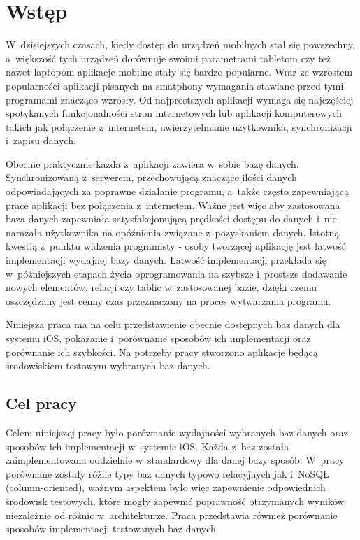 \section{Wstęp}

 W~dzisiejszych czasach, kiedy dostęp do urządzeń mobilnych stał się powszechny, a~większość tych urządzeń dorównuje swoimi parametrami tabletom czy też nawet laptopom aplikacje mobilne stały się bardzo popularne. Wraz ze wzrostem popularności aplikacji pisanych na smatphony wymagania stawiane przed tymi programami znacząco wzrosły. Od najprostszych aplikacji wymaga się najczęściej spotykanych funkcjonalności stron internetowych lub aplikacji komputerowych takich jak połączenie z~internetem, uwierzytelnianie użytkownika, synchronizacji i~zapisu danych. \nocite{Swift-doc} \nocite{Realm-doc} \nocite{FMDB-doc} \nocite{CoreData-doc} \nocite{PorownanieRealm} \nocite{Mockaroo} \nocite{PorownanieDrDobbs} \nocite{SQLite-book} \nocite{CoreDataBook} \nocite{Art2Key} \nocite{Art3Key} \nocite{Art4Key}
\par
Obecnie praktycznie każda z~aplikacji zawiera w~sobie bazę danych. Synchronizowaną z~serwerem, przechowującą znaczące ilości danych odpowiadających za poprawne działanie programu, a~także często zapewniającą prace aplikacji bez połączenia z~internetem. Ważne jest więc aby zastosowana baza danych zapewniała satysfakcjonującą prędkości dostępu do danych i~nie narażała użytkownika na opóźnienia związane z~pozyskaniem danych. Istotną kwestią z~punktu widzenia programisty - osoby tworzącej aplikację jest łatwość implementacji wydajnej bazy danych. Łatwość implementacji przekłada się w~późniejszych etapach życia oprogramowania na szybsze i~prostsze dodawanie nowych elementów, relacji czy tablic w~zastosowanej bazie, dzięki czemu oszczędzany jest cenny czas przeznaczony na proces wytwarzania programu. \par

Niniejsza praca ma na celu przedstawienie obecnie dostępnych baz danych dla systemu iOS, pokazanie i~porównanie  sposobów ich implementacji oraz porównanie ich szybkości. Na potrzeby pracy stworzono aplikacje będącą środowiskiem testowym wybranych baz danych. 
	
\subsection{Cel pracy}

Celem niniejszej pracy było porównanie wydajności wybranych baz danych oraz sposobów ich implementacji w~systemie iOS. Każda z~baz została zaimplementowana oddzielnie w~standardowy dla danej bazy sposób. W~pracy porównane zostały różne typy baz danych typowo relacyjnych jak i~NoSQL (column-oriented), ważnym aspektem było więc zapewnienie odpowiednich środowisk testowych, które mogły zapewnić poprawność otrzymanych wyników niezależnie od różnic w~architekturze. Praca przedstawia również porównanie sposobów implementacji testowanych baz danych.\par

